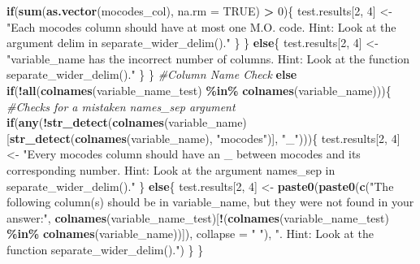\documentclass[
  12pt,
]{book}
\newenvironment{Shaded}{\begin{snugshade}}{\end{snugshade}}
\newcommand{\AttributeTok}[1]{\textcolor[rgb]{0.13,0.29,0.53}{#1}}
\newcommand{\CommentTok}[1]{\textcolor[rgb]{0.56,0.35,0.01}{\textit{#1}}}
\newcommand{\ConstantTok}[1]{\textcolor[rgb]{0.56,0.35,0.01}{#1}}
\newcommand{\ControlFlowTok}[1]{\textcolor[rgb]{0.13,0.29,0.53}{\textbf{#1}}}
\newcommand{\DecValTok}[1]{\textcolor[rgb]{0.00,0.00,0.81}{#1}}
\newcommand{\FunctionTok}[1]{\textcolor[rgb]{0.13,0.29,0.53}{\textbf{#1}}}
\newcommand{\NormalTok}[1]{#1}
\newcommand{\OtherTok}[1]{\textcolor[rgb]{0.56,0.35,0.01}{#1}}
\newcommand{\SpecialCharTok}[1]{\textcolor[rgb]{0.81,0.36,0.00}{\textbf{#1}}}
\newcommand{\StringTok}[1]{\textcolor[rgb]{0.31,0.60,0.02}{#1}}
\begin{document}
\begin{Shaded}
\begin{Highlighting}[]
    \ControlFlowTok{if}\NormalTok{(}\FunctionTok{sum}\NormalTok{(}\FunctionTok{as.vector}\NormalTok{(mocodes\_col), }\AttributeTok{na.rm =} \ConstantTok{TRUE}\NormalTok{) }\SpecialCharTok{\textgreater{}} \DecValTok{0}\NormalTok{)\{}
\NormalTok{      test.results[}\DecValTok{2}\NormalTok{, }\DecValTok{4}\NormalTok{] }\OtherTok{\textless{}{-}} \StringTok{"Each \textasciigrave{}mocodes\textasciigrave{} column should have at most one M.O. code. Hint: Look at the argument \textasciigrave{}delim\textasciigrave{} in \textasciigrave{}separate\_wider\_delim()\textasciigrave{}."}
\NormalTok{    \}}
\NormalTok{  \}}
  \ControlFlowTok{else}\NormalTok{\{}
\NormalTok{    test.results[}\DecValTok{2}\NormalTok{, }\DecValTok{4}\NormalTok{] }\OtherTok{\textless{}{-}} \StringTok{"\textasciigrave{}variable\_name\textasciigrave{} has the incorrect number of columns. Hint: Look at the function \textasciigrave{}separate\_wider\_delim()\textasciigrave{}."}
\NormalTok{  \}}
\NormalTok{\}}
\CommentTok{\#Column Name Check  }
\ControlFlowTok{else} \ControlFlowTok{if}\NormalTok{(}\SpecialCharTok{!}\FunctionTok{all}\NormalTok{(}\FunctionTok{colnames}\NormalTok{(variable\_name\_test) }\SpecialCharTok{\%in\%} \FunctionTok{colnames}\NormalTok{(variable\_name)))\{}
  \CommentTok{\#Checks for a mistaken \textasciigrave{}names\_sep\textasciigrave{} argument }
  \ControlFlowTok{if}\NormalTok{(}\FunctionTok{any}\NormalTok{(}\SpecialCharTok{!}\FunctionTok{str\_detect}\NormalTok{(}\FunctionTok{colnames}\NormalTok{(variable\_name)[}\FunctionTok{str\_detect}\NormalTok{(}\FunctionTok{colnames}\NormalTok{(variable\_name), }\StringTok{"mocodes"}\NormalTok{)], }\StringTok{"\_"}\NormalTok{)))\{}
\NormalTok{    test.results[}\DecValTok{2}\NormalTok{, }\DecValTok{4}\NormalTok{] }\OtherTok{\textless{}{-}} \StringTok{"Every \textasciigrave{}mocodes\textasciigrave{} column should have an \textasciigrave{}\_\textasciigrave{} between \textasciigrave{}mocodes\textasciigrave{} and its corresponding number. Hint: Look at the argument \textasciigrave{}names\_sep\textasciigrave{} in \textasciigrave{}separate\_wider\_delim().\textasciigrave{}"}
\NormalTok{  \} }
  \ControlFlowTok{else}\NormalTok{\{}
\NormalTok{    test.results[}\DecValTok{2}\NormalTok{, }\DecValTok{4}\NormalTok{] }\OtherTok{\textless{}{-}} \FunctionTok{paste0}\NormalTok{(}\FunctionTok{paste0}\NormalTok{(}\FunctionTok{c}\NormalTok{(}\StringTok{"The following column(s) should be in \textasciigrave{}variable\_name\textasciigrave{}, but they were not found in your answer:"}\NormalTok{,}
                                   \FunctionTok{colnames}\NormalTok{(variable\_name\_test)[}\SpecialCharTok{!}\NormalTok{(}\FunctionTok{colnames}\NormalTok{(variable\_name\_test) }\SpecialCharTok{\%in\%} \FunctionTok{colnames}\NormalTok{(variable\_name))]),}
                                   \AttributeTok{collapse =} \StringTok{"  "}\NormalTok{), }\StringTok{". Hint: Look at the function \textasciigrave{}separate\_wider\_delim().\textasciigrave{}"}\NormalTok{)}
\NormalTok{  \}}
\NormalTok{\}}


\end{Highlighting}
\end{Shaded}
\end{document}
